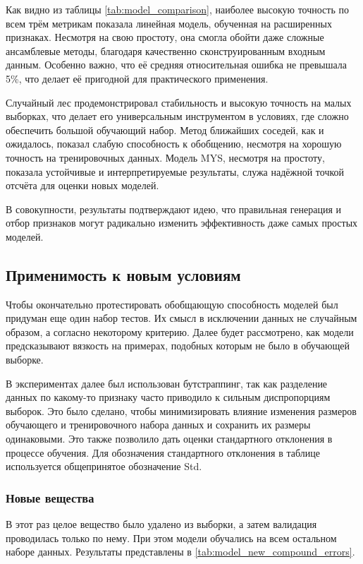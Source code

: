 \documentclass[a4paper,12pt]{article}
\begin{document}
    
    Как видно из таблицы \autoref{tab:model_comparison}, наиболее высокую точность по всем трём метрикам показала линейная модель, обученная на расширенных признаках. Несмотря на свою простоту, она смогла обойти даже сложные ансамблевые методы, благодаря качественно сконструированным входным данным. Особенно важно, что её средняя относительная ошибка не превышала 5\%, что делает её пригодной для практического применения.
    
    Случайный лес продемонстрировал стабильность и высокую точность на малых выборках, что делает его универсальным инструментом в условиях, где сложно обеспечить большой обучающий набор. Метод ближайших соседей, как и ожидалось, показал слабую способность к обобщению, несмотря на хорошую точность на тренировочных данных. Модель MYS, несмотря на простоту, показала устойчивые и интерпретируемые результаты, служа надёжной точкой отсчёта для оценки новых моделей.
    
    В совокупности, результаты подтверждают идею, что правильная генерация и отбор признаков могут радикально изменить эффективность даже самых простых моделей.

  \subsection{Применимость к новым условиям}

    Чтобы окончательно протестировать обобщающую способность моделей был придуман еще один набор тестов. Их смысл в исключении данных не случайным образом, а согласно некоторому критерию. Далее будет рассмотрено, как модели предсказывают вязкость на примерах, подобных которым не было в обучающей выборке. 

    В экспериментах далее был использован бутстраппинг, так как разделение данных по какому-то признаку часто приводило к сильным диспропорциям выборок. Это было сделано, чтобы минимизировать влияние изменения размеров обучающего и тренировочного набора данных и сохранить их размеры одинаковыми. Это также позволило дать оценки стандартного отклонения в процессе обучения. Для обозначения стандартного отклонения в таблице используется общепринятое обозначение Std.

    \subsubsection{Новые вещества}

      В этот раз целое вещество было удалено из выборки, а затем валидация проводилась только по нему. При этом модели обучались на всем остальном наборе данных. Результаты представлены в \autoref{tab:model_new_compound_errors}.
\end{document}
